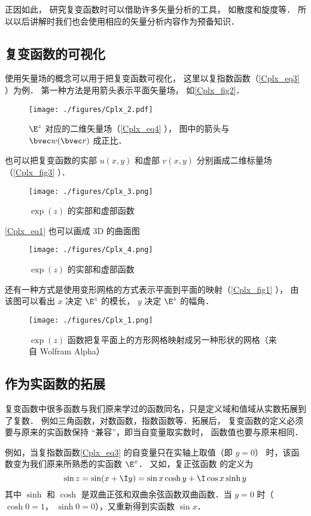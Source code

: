 正因如此， 研究复变函数时可以借助许多矢量分析的工具， 如散度和旋度等． 所以以后讲解时我们也会使用相应的矢量分析内容作为预备知识．

\subsection{复变函数的可视化}
使用矢量场的概念可以用于把复变函数可视化， 这里以复指数函数（\autoref{Cplx_eq3} ）为例． 第一种方法是用箭头表示平面矢量场， 如\autoref{Cplx_fig2}．
\begin{figure}[ht]
\centering
\texttt{[image: ./figures/Cplx\_2.pdf]}
\caption{$\E^z$ 对应的二维矢量场（\autoref{Cplx_eq4} ）， 图中的箭头与 $\bvec w(\bvec r)$ 成正比．} \label{Cplx_fig2}
\end{figure}
也可以把复变函数的实部 $u(x,y)$ 和虚部 $v(x, y)$ 分别画成二维标量场（\autoref{Cplx_fig3} ）．
\begin{figure}[ht]
\centering
\texttt{[image: ./figures/Cplx\_3.png]}
\caption{$\exp(z)$ 的实部和虚部函数} \label{Cplx_fig3}
\end{figure}
\autoref{Cplx_eq1} 也可以画成 3D 的曲面图
\begin{figure}[ht]
\centering
\texttt{[image: ./figures/Cplx\_4.png]}
\caption{$\exp(z)$ 的实部和虚部函数} \label{Cplx_fig4}
\end{figure}

还有一种方式是使用变形网格的方式表示平面到平面的映射（\autoref{Cplx_fig1} ）， 由该图可以看出 $x$ 决定 $\E^z$ 的模长， $y$ 决定 $\E^z$ 的幅角．
\begin{figure}[ht]
\centering
\texttt{[image: ./figures/Cplx\_1.png]}
\caption{$\exp(z)$ 函数把复平面上的方形网格映射成另一种形状的网格（来自 Wolfram Alpha）} \label{Cplx_fig1}
\end{figure}

\subsection{作为实函数的拓展}
复变函数中很多函数与我们原来学过的函数同名，只是定义域和值域从实数拓展到了复数． 例如三角函数，对数函数，指数函数等．拓展后， 复变函数的定义必须要与原来的实函数保持 “兼容”，即当自变量取实数时， 函数值也要与原来相同．

例如，当复指数函数\autoref{Cplx_eq3} 的自变量只在实轴上取值（即 $y = 0$） 时，该函数变为我们原来所熟悉的实函数 $\E^x$．  又如，复正弦函数 的定义为
\begin{equation}\label{Cplx_eq2}
\sin z = \sin(x + \I y) = \sin x\cosh y + \I\cos x\sinh y
\end{equation}
其中 $\sinh $ 和 $\cosh $ 是双曲正弦和双曲余弦函数双曲函数．当 $y = 0$ 时（$\cosh 0 = 1$， $\sinh 0 = 0$），又重新得到实函数 $\sin x$．

